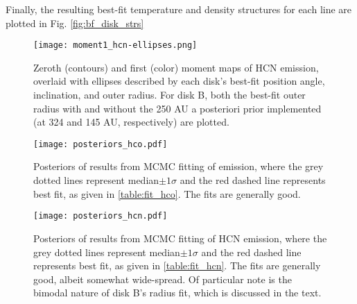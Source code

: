 Finally, the resulting best-fit temperature and density structures for each line are plotted in Fig. \ref{fig:bf_disk_strs}









\begin{figure}[htp]
  \hspace*{\fill}%
  \texttt{[image: moment1\_hcn-ellipses.png]}\hfill%
  \hspace*{\fill}%
  \caption{Zeroth (contours) and first (color) moment maps of HCN emission, overlaid with ellipses described by each disk's best-fit position angle, inclination, and outer radius. For disk B, both the best-fit outer radius with and without the 250 AU a posteriori prior implemented (at 324 and 145 AU, respectively) are plotted.}
  \label{fig:hcn_m1_ellipses}
\end{figure}




\begin{figure}%
  \hspace*{\fill}%
  \texttt{[image: posteriors\_hco.pdf]}\hfill%
  \hspace*{\fill}%
  \caption{Posteriors of results from MCMC fitting of \hco emission, where the grey dotted lines represent median$\pm 1\sigma$ and the red dashed line represents best fit, as given in \ref{table:fit_hco}. The fits are generally good.}
  \label{fig:hco_posteriors}
\end{figure}


\begin{figure}%
  \hspace*{\fill}%
  \texttt{[image: posteriors\_hcn.pdf]}\hfill%
  \hspace*{\fill}%
  \caption{Posteriors of results from MCMC fitting of HCN emission, where the grey dotted lines represent median$\pm 1\sigma$ and the red dashed line represents best fit, as given in \ref{table:fit_hcn}. The fits are generally good, albeit somewhat wide-spread. Of particular note is the bimodal nature of disk B's radius fit, which is discussed in the text.}
  \label{fig:hcn_posteriors}
\end{figure}


